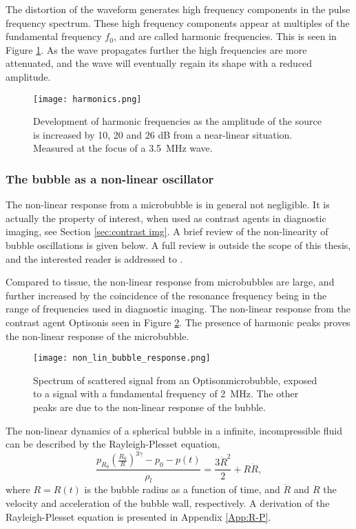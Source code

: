 The distortion of the waveform generates high frequency components in the pulse frequency spectrum. These high frequency components appear at multiples of the fundamental frequency $f_0$, and are called harmonic frequencies. This is seen in Figure \ref{Fig:harmonics}. As the wave propagates further the high frequencies are more attenuated, and the wave will eventually regain its shape with a reduced amplitude. 

\begin{figure}[h]
  \centering
  \label{Fig:harmonics}
  \texttt{[image: harmonics.png]}
  \caption{Development of harmonic frequencies as the amplitude of the source is increased by 10, 20 and 26 dB from a near-linear situation. Measured at the focus of a \SI{3.5}{\mega\hertz} wave\cite{Uck2002}.}
\end{figure} 


\subsubsection{The bubble as a non-linear oscillator}
The non-linear response from a microbubble is in general not negligible. It is actually the property of interest, when used as contrast agents in diagnostic imaging, see Section \ref{sec:contrast img}. A brief review of the non-linearity of bubble oscillations is given below. A full review is outside the scope of this thesis, and the interested reader is addressed to \cite{Hoff2000}. 

Compared to tissue, the non-linear response from microbubbles are large, and further increased by the coincidence of the resonance frequency being in the range of frequencies used in diagnostic imaging. The non-linear response from the contrast agent   Optison\texttrademark is seen in Figure \ref{Fig:bub_response}. The presence of harmonic peaks proves the non-linear response of the microbubble. 

\begin{figure}[h]
  \centering
  \label{Fig:bub_response}
  \texttt{[image: non\_lin\_bubble\_response.png]}
  \caption{Spectrum of scattered signal from an Optison\texttrademark microbubble, exposed to a signal with a fundamental frequency of \SI{2}{\mega\hertz}. The other peaks are due to the non-linear response of the bubble\cite{Shi1999}.}
\end{figure}
The non-linear dynamics of a spherical bubble in a infinite, incompressible fluid can be described by the Rayleigh-Plesset equation,
\begin{equation}
\label{r-p}
\frac{p_{R_0}\left(\frac{R_0}{R}\right)^{3\gamma}-p_0 - p(t)}{\rho_l} = \frac{3\dot{R}^2}{2}+R\ddot{R},
\end{equation}
where $R = R(t)$ is the bubble radius as a function of time, and $\dot{R}$ and $\ddot{R}$ the velocity and acceleration of the bubble wall, respectively. A derivation of the Rayleigh-Plesset equation is presented in Appendix \ref{App:R-P}.

